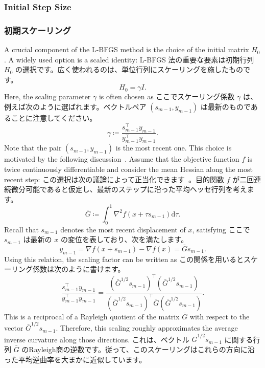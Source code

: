 \documentclass[0_main]{subfiles}
\begin{document}
\ifEn
    \subsubsection{Initial Step Size}
\else
    \subsubsection{初期スケーリング}
\fi

\ifEn
    A crucial component of the L-BFGS method is the choice of the initial matrix $H_0$. A widely used option is a scaled identity:
\else
    L-BFGS 法の重要な要素は初期行列 $H_0$ の選択です。広く使われるのは、単位行列にスケーリングを施したものです。
\fi
\begin{equation*}
    H_0 = \gamma I.
\end{equation*}
\ifEn
    Here, the scaling parameter $\gamma$ is often chosen as
\else
    ここでスケーリング係数 $\gamma$ は、例えば次のように選ばれます。ベクトルペア $(s_{m-1}, y_{m-1})$ は最新のものであることに注意してください。
\fi
\begin{equation*}
    \gamma \coloneqq \frac{s_{m-1}^\top y_{m-1}}{y_{m-1}^\top y_{m-1}}.
\end{equation*}
\ifEn
    Note that the pair $(s_{m-1}, y_{m-1})$ is the most recent one.
    This choice is motivated by the following discussion~\citep{liuLimitedMemoryBFGS1989,shannoMatrixConditioningNonlinear1978}. Assume that the objective function $f$ is twice continuously differentiable and consider the mean Hessian along the most recent step:
\else
    この選択は次の議論によって正当化できます~\citep{liuLimitedMemoryBFGS1989,shannoMatrixConditioningNonlinear1978}。目的関数 $f$ が二回連続微分可能であると仮定し、最新のステップに沿った平均ヘッセ行列を考えます。
\fi
\begin{equation*}
    \bar{G} \coloneqq \int_0^1 \nabla^2 f(x + \tau s_{m-1}) \mathrm{d}\tau.
\end{equation*}
\ifEn
    Recall that $s_{m-1}$ denotes the most recent displacement of $x$, satisfying
\else
    ここで $s_{m-1}$ は最新の $x$ の変位を表しており、次を満たします。
\fi
\begin{equation*}
    y_{m-1}
    =
    \nabla f(x+s_{m-1}) - \nabla f(x)
    =
    \bar{G} s_{m-1}.
\end{equation*}
\ifEn
    Using this relation, the scaling factor can be written as
\else
    この関係を用いるとスケーリング係数は次のように書けます。
\fi
\begin{equation*}
    \frac{s_{m-1}^\top y_{m-1}}{y_{m-1}^\top y_{m-1}}
    =
    \frac{(\bar{G}^{1/2} s_{m-1})^\top (\bar{G}^{1/2} s_{m-1})}
    {(\bar{G}^{1/2} s_{m-1})^\top \bar{G} (\bar{G}^{1/2} s_{m-1})}.
\end{equation*}
\ifEn
    This is a reciprocal of a Rayleigh quotient of the matrix $\bar{G}$ with respect to the vector $\bar{G}^{1/2} s_{m-1}$. Therefore, this scaling roughly approximates the average inverse curvature along those directions.
\else
    これは、ベクトル $\bar{G}^{1/2} s_{m-1}$ に関する行列 $\bar{G}$ のRayleigh商の逆数です。従って、このスケーリングはこれらの方向に沿った平均逆曲率を大まかに近似しています。
\fi
\end{document}
